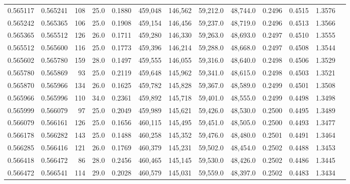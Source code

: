 \begin{tabular}{rrrrrrrrrrrrr}
0.565117 & 0.565241 &   108 & 25.0 &                                     0.1880 & 459,048 & 146,562 &  59,212.0 &  48,744.0 & 0.2496 & 0.4515 & 1.3576 \\
0.565242 & 0.565365 &   106 & 25.0 &                                     0.1908 & 459,154 & 146,456 &  59,237.0 &  48,719.0 & 0.2496 & 0.4513 & 1.3566 \\
0.565365 & 0.565512 &   126 & 26.0 &                                     0.1711 & 459,280 & 146,330 &  59,263.0 &  48,693.0 & 0.2497 & 0.4510 & 1.3555 \\
0.565512 & 0.565600 &   116 & 25.0 &                                     0.1773 & 459,396 & 146,214 &  59,288.0 &  48,668.0 & 0.2497 & 0.4508 & 1.3544 \\
0.565602 & 0.565780 &   159 & 28.0 &                                     0.1497 & 459,555 & 146,055 &  59,316.0 &  48,640.0 & 0.2498 & 0.4506 & 1.3529 \\
0.565780 & 0.565869 &    93 & 25.0 &                                     0.2119 & 459,648 & 145,962 &  59,341.0 &  48,615.0 & 0.2498 & 0.4503 & 1.3521 \\
0.565870 & 0.565966 &   134 & 26.0 &                                     0.1625 & 459,782 & 145,828 &  59,367.0 &  48,589.0 & 0.2499 & 0.4501 & 1.3508 \\
0.565966 & 0.565996 &   110 & 34.0 &                                     0.2361 & 459,892 & 145,718 &  59,401.0 &  48,555.0 & 0.2499 & 0.4498 & 1.3498 \\
0.565999 & 0.566079 &    97 & 25.0 &                                     0.2049 & 459,989 & 145,621 &  59,426.0 &  48,530.0 & 0.2500 & 0.4495 & 1.3489 \\
0.566079 & 0.566161 &   126 & 25.0 &                                     0.1656 & 460,115 & 145,495 &  59,451.0 &  48,505.0 & 0.2500 & 0.4493 & 1.3477 \\
0.566178 & 0.566282 &   143 & 25.0 &                                     0.1488 & 460,258 & 145,352 &  59,476.0 &  48,480.0 & 0.2501 & 0.4491 & 1.3464 \\
0.566285 & 0.566416 &   121 & 26.0 &                                     0.1769 & 460,379 & 145,231 &  59,502.0 &  48,454.0 & 0.2502 & 0.4488 & 1.3453 \\
0.566418 & 0.566472 &    86 & 28.0 &                                     0.2456 & 460,465 & 145,145 &  59,530.0 &  48,426.0 & 0.2502 & 0.4486 & 1.3445 \\
0.566472 & 0.566541 &   114 & 29.0 &                                     0.2028 & 460,579 & 145,031 &  59,559.0 &  48,397.0 & 0.2502 & 0.4483 & 1.3434 \\

\end{tabular}
